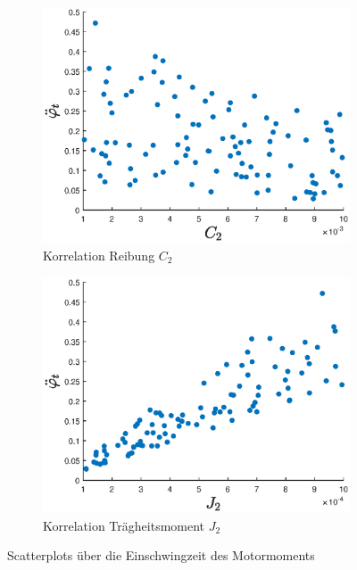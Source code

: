 \begin{figure}
    \centering
    \begin{subfigure}[]{0.45\textwidth}
        \centering
        \includegraphics[width=\textwidth]{Bilder/5_sensi/cm/dotdot_phi_t_c2.eps}
        \caption{Korrelation Reibung $C_2$}
        \label{fig:scatter_tau_t_c2}
    \end{subfigure}
   \begin{subfigure}[]{0.45\textwidth}
        \centering
        \includegraphics[width=\textwidth]{Bilder/5_sensi/cm/dotdot_phi_t_j2.eps}
        \caption{Korrelation Trägheitsmoment $J_2$}
        \label{fig:scatter_tau_t_j2}
    \end{subfigure}
    \caption{Scatterplots über die Einschwingzeit des Motormoments}
\end{figure}
